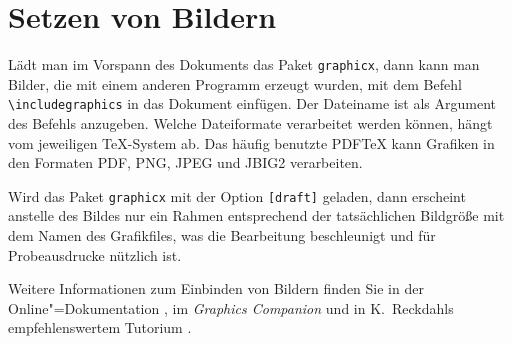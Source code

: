 
\section{Setzen von Bildern} \label{graphics}

Lädt man im Vorspann des Dokuments das Paket \texttt{graphicx}, dann kann man
Bilder, die mit einem anderen Programm erzeugt wurden,  mit dem Befehl
\lstinline|\includegraphics| in das Dokument einfügen. Der Dateiname ist als
Argument des Befehls anzugeben. Welche Dateiformate verarbeitet werden können,
hängt vom jeweiligen \TeX-System ab. Das häufig benutzte PDF\TeX{} kann
Grafiken in den Formaten PDF, PNG, JPEG und JBIG2 verarbeiten.



\noindent Wird das Paket \texttt{graphicx} mit der Option \texttt{[draft]} geladen,
dann erscheint anstelle des Bildes nur ein Rahmen entsprechend
der tatsächlichen Bildgröße mit dem Namen des Grafikfiles, 
was die Bearbeitung beschleunigt und für Probeausdrucke nützlich ist.

Weitere Informationen zum Einbinden von Bildern finden Sie in der
Online"=Dokumentation \cite{grfguide}, im \textit{Graphics Companion}
\cite{grfcomp} und in K.~Reckdahls empfehlenswertem  Tutorium \cite{epslatex}.



